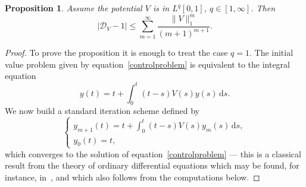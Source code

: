 \documentclass[11pt]{article}
\providecommand{\dpl}{\displaystyle}
\theoremstyle{plain}
\newtheorem{prop}[theorem]{Proposition}
\theoremstyle{definition}
\newcommand{\DD}{\mathscr{D}}
\renewcommand{\d}{\mathrm{d}}
\let\balpha q
\begin{document}
\begin{prop}\label{thmupperbound}
Assume the potential $V$ is in $L^{\balpha}[0,1]$, $\balpha \in [1,\infty]$.
Then
\[
\left| \DD_V-1\right|\leq \sum_{m=1}^{\infty} \frac{ \|V\|_{1}^{m}}{ (m+1)^{m+1}}.
\]
\end{prop}
\begin{proof}
To prove the proposition it is enough to treat the case $\balpha=1$.
The initial value problem given by equation~\eqref{controlproblem} is equivalent to the integral equation
\[
y(t) = t + {\int_{0}^{t}}(t-s)V(s)y(s) \, \d s.
\]
We now build a standard iteration scheme defined by
\begin{equation}\label{iterationsch}
\begin{cases}
y_{m+1}(t)=t+\dpl\int_{0}^{t}(t-s)V(s)y_{m}(s) \, \d s,\\
y_{0}(t)=t,
\end{cases}
\end{equation}
which converges to the solution of equation~\eqref{controlproblem} --- this is a classical result from the theory of ordinary differential
equations which may be found, for instance, in~\cite{CL}, and which also follows from the computations below.


\end{proof}
\end{document}
